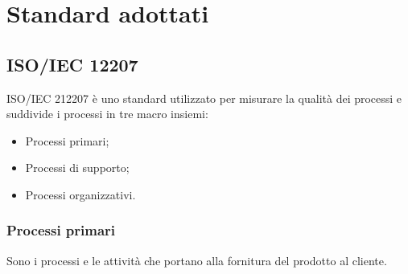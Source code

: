 \section{Standard adottati}

\subsection{ISO/IEC 12207}
ISO/IEC 212207 è uno standard utilizzato per misurare la qualità dei processi e suddivide i processi in tre macro insiemi:
\begin{itemize}
    \item Processi primari;
    \item Processi di supporto;
    \item Processi organizzativi.
\end{itemize}

\subsubsection{Processi primari}
Sono i processi e le attività che portano alla fornitura del prodotto al cliente.
